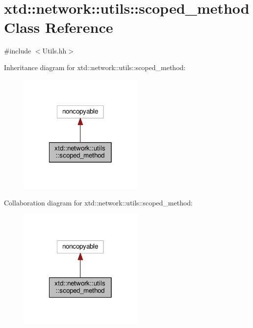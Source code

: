 \hypertarget{classxtd_1_1network_1_1utils_1_1scoped__method}{\section{xtd\-:\-:network\-:\-:utils\-:\-:scoped\-\_\-method Class Reference}
\label{classxtd_1_1network_1_1utils_1_1scoped__method}
}


{\ttfamily \#include $<$Utils.\-hh$>$}



Inheritance diagram for xtd\-:\-:network\-:\-:utils\-:\-:scoped\-\_\-method\-:
\nopagebreak
\begin{figure}[H]
\begin{center}
\leavevmode
\includegraphics[width=174pt]{classxtd_1_1network_1_1utils_1_1scoped__method__inherit__graph}
\end{center}
\end{figure}


Collaboration diagram for xtd\-:\-:network\-:\-:utils\-:\-:scoped\-\_\-method\-:
\nopagebreak
\begin{figure}[H]
\begin{center}
\leavevmode
\includegraphics[width=174pt]{classxtd_1_1network_1_1utils_1_1scoped__method__coll__graph}
\end{center}
\end{figure}
